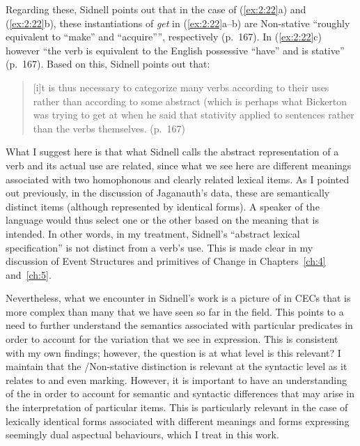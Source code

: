 Regarding these, Sidnell points out that in the case of
(\ref{ex:2:22}a) and (\ref{ex:2:22}b), these instantiations of
\textit{get} in (\ref{ex:2:22}a--b) are Non-stative ``roughly equivalent
to ``make” and ``acquire””, respectively (p.~167).  In (\ref{ex:2:22}c)
however ``the verb is equivalent to the English possessive ``have” and
is stative” (p.~167). Based on this, Sidnell points out that:

\begin{quote}
[i]t is thus necessary to categorize many verbs according to their
uses rather than according to some abstract 
(which is perhaps what Bickerton was trying to get at when he said
that stativity applied to sentences rather than the verbs themselves.
(p.~167)
\end{quote}

What I suggest here is that what Sidnell calls the abstract
representation of a verb and its actual use are related, since what we see
here are different meanings associated with two homophonous and
clearly related lexical items.  As I pointed out previously, in the
discussion of Jaganauth’s data, these are semantically distinct items
(although represented by identical forms).  A speaker of the language
would thus select one or the other based on the meaning that is
intended. In other words, in my treatment, Sidnell’s ``abstract lexical
specification” is not distinct from a verb’s use.  This is made clear
in my discussion of Event Structures and primitives of Change in
Chapters~\ref{ch:4} and~\ref{ch:5}.

Nevertheless, what we encounter in Sidnell’s work is a picture of
 in CECs that is more complex than many that we have seen so far
in the field.  This points to a need to further understand the
semantics associated with particular predicates in order to account
for the variation that we see in  expression.  This is
consistent with my own findings; however, the question is at what
level is this relevant?  I maintain that the \slash Non-stative
distinction is relevant at the syntactic level as it relates to
 and even  marking.  However, it is
important to have an understanding of the  in
order to account for semantic and syntactic differences that may arise
in the interpretation of particular items.  This is particularly
relevant in the case of lexically identical forms associated with
different meanings and forms expressing seemingly dual aspectual
behaviours, which I treat in this work.

